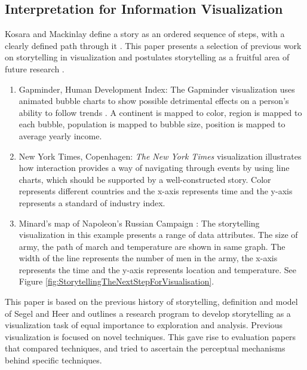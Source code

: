 \documentclass{egpubl}
\begin{document}
\subsection{Interpretation for Information Visualization}
Kosara and Mackinlay define a story as an ordered sequence of steps, with a clearly defined path through it \cite{Kosara}.
This paper presents a selection of previous work on storytelling in visualization and postulates storytelling as a fruitful area of future research \cite{Kosara}.
\begin{enumerate}
\item Gapminder, Human Development Index: The Gapminder visualization uses animated bubble charts to show possible detrimental effects on a person's ability to follow trends \cite{Rebortson}. A continent is mapped to color, region is mapped to each bubble, population is mapped to bubble size, position is mapped to average yearly income.
\item New York Times, Copenhagen: \textit{The New York Times} visualization illustrates how interaction provides a way of navigating through events by using line charts, which should be supported by a well-constructed story. Color represents different countries and the x-axis represents time and the y-axis represents a standard of industry index.
\item Minard's map of Napoleon's Russian Campaign : The storytelling visualization in this example presents a range of data attributes.  The size of army, the path of march and temperature are shown in same graph. The width of the line represents the number of men in the army, the x-axis represents the time and the y-axis represents location and temperature. See Figure \ref{fig:StorytellingTheNextStepForVisualisation}.
\end{enumerate}
This paper is based on  the previous history of storytelling, definition and model of Segel and Heer \cite{segal} and outlines a research program to develop storytelling as a visualization task of equal importance to exploration and analysis. Previous visualization is focused on novel techniques. This gave rise to evaluation papers 
that compared techniques, and tried to ascertain the perceptual mechanisms behind specific techniques.
\end{document}
